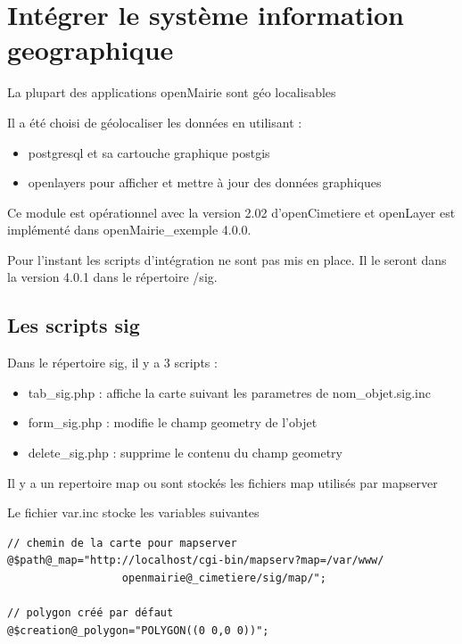 \documentclass[letterpaper,10pt,french]{manual}
\begin{document}
\resetcurrentobjects
\hypertarget{--doc-framework/sig}{}

\hypertarget{sig}{}\section{Intégrer le système information geographique}

La plupart des applications openMairie sont géo localisables

Il a été choisi de géolocaliser les données en utilisant :
\begin{itemize}
\item {} 
postgresql et sa cartouche graphique postgis

\item {} 
openlayers pour afficher et mettre à jour des données graphiques

\end{itemize}

Ce module est opérationnel avec la version 2.02 d'openCimetiere et openLayer
est implémenté dans openMairie\_exemple 4.0.0.

Pour l'instant les  scripts d'intégration ne sont pas mis en place. Il le seront
dans la version 4.0.1 dans le répertoire /sig.


\subsection{Les scripts sig}

Dans le répertoire sig, il y a 3 scripts :
\begin{itemize}
\item {} 
tab\_sig.php : affiche la carte suivant les parametres de nom\_objet.sig.inc

\item {} 
form\_sig.php : modifie le champ geometry de l'objet

\item {} 
delete\_sig.php : supprime le contenu  du champ geometry

\end{itemize}

Il y a un repertoire map ou sont stockés les fichiers map utilisés par mapserver

Le fichier var.inc stocke les variables suivantes

\begin{Verbatim}[commandchars=@\[\]]
// chemin de la carte pour mapserver
@$path@_map="http://localhost/cgi-bin/mapserv?map=/var/www/
                  openmairie@_cimetiere/sig/map/";

// polygon créé par défaut
@$creation@_polygon="POLYGON((0 0,0 0))";
\end{Verbatim}
\end{document}
